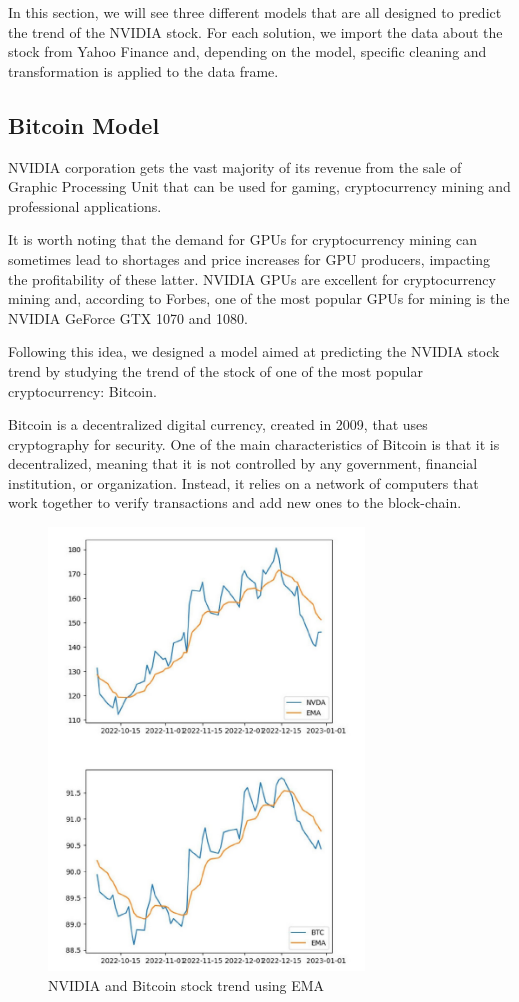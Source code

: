 \documentclass[conference,compsoc]{IEEEtran}
\begin{document}
In this section, we will see three different models that are all designed to predict the trend of the NVIDIA stock.
%
For each solution, we import the data about the stock from Yahoo Finance and, depending on the model, specific cleaning and transformation is applied to the data frame.

\subsection*{Bitcoin Model}

NVIDIA corporation gets the vast majority of its revenue from the sale of Graphic Processing Unit that can be used for gaming, cryptocurrency mining and professional applications.

It is worth noting that the demand for GPUs for cryptocurrency mining can sometimes lead to shortages and price increases for GPU producers, impacting the profitability of these latter.
%
NVIDIA GPUs are excellent for cryptocurrency mining and, according to Forbes, one of the most popular GPUs for mining is the NVIDIA GeForce GTX 1070 and 1080.

Following this idea, we designed a model aimed at predicting the NVIDIA stock trend by studying the trend of the stock of one of the most popular cryptocurrency: Bitcoin.

Bitcoin is a decentralized digital currency, created in 2009, that uses cryptography for security.
%
One of the main characteristics of Bitcoin is that it is decentralized, meaning that it is not controlled by any government, financial institution, or organization.
%
Instead, it relies on a network of computers that work together to verify transactions and add new ones to the block-chain.

\begin{figure}[ht]
\centering
\includegraphics[width=3.3in]{images/nvidia-vs-bitcoin.jpg}
\caption{NVIDIA and Bitcoin stock trend using EMA}
\label{bitcoin}
\end{figure}
\end{document}
